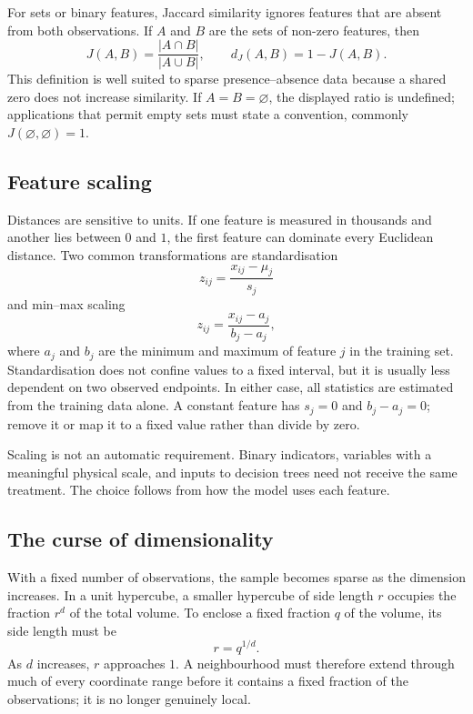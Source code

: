 For sets or binary features, Jaccard similarity ignores features that are absent
from both observations. If $A$ and $B$ are the sets of non-zero features, then
\[
J(A,B)=\frac{|A\cap B|}{|A\cup B|},
\qquad
d_J(A,B)=1-J(A,B).
\]
This definition is well suited to sparse presence--absence data because a
shared zero does not increase similarity. If $A=B=\varnothing$, the displayed
ratio is undefined; applications that permit empty sets must state a convention,
commonly $J(\varnothing,\varnothing)=1$.

\subsection{Feature scaling}

Distances are sensitive to units. If one feature is measured in thousands and
another lies between $0$ and $1$, the first feature can dominate every
Euclidean distance. Two common transformations are standardisation
\[
z_{ij}=\frac{x_{ij}-\mu_j}{s_j}
\]
and min--max scaling
\[
z_{ij}=\frac{x_{ij}-a_j}{b_j-a_j},
\]
where $a_j$ and $b_j$ are the minimum and maximum of feature $j$ in the
training set. Standardisation does not confine values to a fixed interval, but
it is usually less dependent on two observed endpoints. In either case, all
statistics are estimated from the training data alone. A constant feature has
$s_j=0$ and $b_j-a_j=0$; remove it or map it to a fixed value rather than divide
by zero.

Scaling is not an automatic requirement. Binary indicators, variables with a
meaningful physical scale, and inputs to decision trees need not receive the
same treatment. The choice follows from how the model uses each feature.

\subsection{The curse of dimensionality}
\label{sec:knn-dimensionality}

With a fixed number of observations, the sample becomes sparse as the dimension
increases. In a unit hypercube, a smaller hypercube of side length $r$ occupies
the fraction $r^d$ of the total volume. To enclose a fixed fraction $q$ of the
volume, its side length must be
\[
r=q^{1/d}.
\]
As $d$ increases, $r$ approaches $1$. A neighbourhood must therefore extend
through much of every coordinate range before it contains a fixed fraction of
the observations; it is no longer genuinely local.

